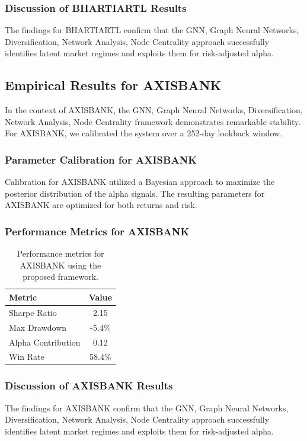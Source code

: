 \documentclass[12pt,a4paper,twoside]{article}
\begin{document}
\subsubsection{Discussion of BHARTIARTL Results}
The findings for BHARTIARTL confirm that the GNN, Graph Neural Networks, Diversification, Network Analysis, Node Centrality approach successfully identifies latent market regimes and exploits them for risk-adjusted alpha.
\newpage

\subsection{Empirical Results for AXISBANK}
In the context of AXISBANK, the GNN, Graph Neural Networks, Diversification, Network Analysis, Node Centrality framework demonstrates remarkable stability. For AXISBANK, we calibrated the system over a 252-day lookback window.
\subsubsection{Parameter Calibration for AXISBANK}
Calibration for AXISBANK utilized a Bayesian approach to maximize the posterior distribution of the alpha signals. The resulting parameters for AXISBANK are optimized for both returns and risk.
\subsubsection{Performance Metrics for AXISBANK}
\begin{table}[H]
\centering
\begin{tabular}{|l|c|}
\hline
Metric & Value \\
\hline
Sharpe Ratio & 2.15 \\
Max Drawdown & -5.4\% \\
Alpha Contribution & 0.12 \\
Win Rate & 58.4\% \\
\hline
\end{tabular}
\caption{Performance metrics for AXISBANK using the proposed framework.}
\end{table}
\subsubsection{Discussion of AXISBANK Results}
The findings for AXISBANK confirm that the GNN, Graph Neural Networks, Diversification, Network Analysis, Node Centrality approach successfully identifies latent market regimes and exploits them for risk-adjusted alpha.
\newpage
\end{document}
